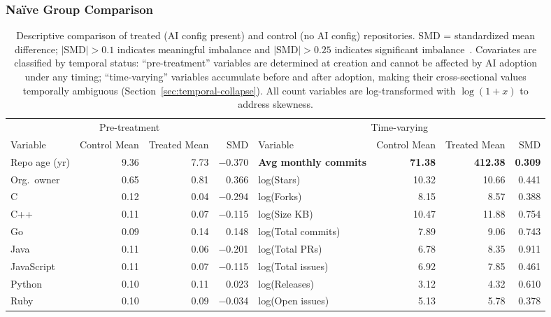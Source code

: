 \subsubsection{Na\"ive Group Comparison}
\label{sec:naive-comparison}

\begin{table}[t]
  \centering
  \begin{threeparttable}
  \caption{Descriptive comparison of treated (AI config present) and control (no AI config) repositories.
  SMD = standardized mean difference; $|\text{SMD}| > 0.1$ indicates meaningful imbalance and $|\text{SMD}| > 0.25$ indicates significant imbalance~\cite{austin2009balance}.
  Covariates are classified by temporal status: ``pre-treatment'' variables are determined at creation and cannot be affected by AI adoption under any timing; ``time-varying'' variables accumulate before and after adoption, making their cross-sectional values temporally ambiguous (Section~\ref{sec:temporal-collapse}).
  All count variables are log-transformed with $\log(1+x)$ to address skewness.}
  \label{tab:descriptive}
  \footnotesize
  \setlength{\tabcolsep}{2pt}
  \begin{tabular}{@{} l rrr l rrr @{}}
  \toprule
  \multicolumn{4}{c}{Pre-treatment\tnote{a}} & \multicolumn{4}{c}{Time-varying} \\
  \cmidrule(r){1-4} \cmidrule(l){5-8}
  Variable & Control Mean & Treated Mean & SMD & Variable & Control Mean & Treated Mean & SMD \\
  \midrule
  Repo age (yr) & 9.36 & 7.73 & $-$0.370 & \textbf{Avg monthly commits} & \textbf{71.38} & \textbf{412.38} & \textbf{0.309} \\
  Org.\ owner\tnote{b} & 0.65 & 0.81 & 0.366 & log(Stars) & 10.32 & 10.66 & 0.441 \\
  C & 0.12 & 0.04 & $-$0.294 & log(Forks) & 8.15 & 8.57 & 0.388 \\
  C++ & 0.11 & 0.07 & $-$0.115 & log(Size KB) & 10.47 & 11.88 & 0.754 \\
  Go & 0.09 & 0.14 & 0.148 & log(Total commits) & 7.89 & 9.06 & 0.743 \\
  Java & 0.11 & 0.06 & $-$0.201 & log(Total PRs) & 6.78 & 8.35 & 0.911 \\
  JavaScript & 0.11 & 0.07 & $-$0.115 & log(Total issues) & 6.92 & 7.85 & 0.461 \\
  Python & 0.10 & 0.11 & 0.023 & log(Releases) & 3.12 & 4.32 & 0.610 \\
  Ruby & 0.10 & 0.09 & $-$0.034 & log(Open issues) & 5.13 & 5.78 & 0.378 \\

\end{tabular}
\end{threeparttable}
\end{table}
